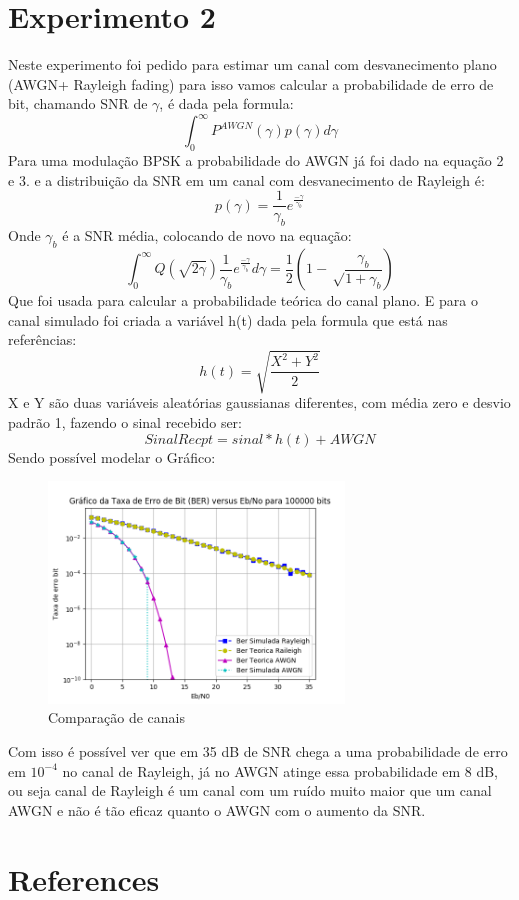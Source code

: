 \documentclass[12pt]{article}
\begin{document}
\section{Experimento 2}
Neste experimento foi pedido para estimar um canal com desvanecimento plano (AWGN+ Rayleigh fading) para isso vamos calcular a probabilidade de erro de bit, chamando SNR de $\gamma$, é dada pela formula:
\begin{equation}
    \int_{0}^{\infty} P^{AWGN}(\gamma )p(\gamma)d\gamma
\end{equation}
Para uma modulação BPSK a probabilidade do AWGN já foi dado na equação 2 e 3. e a distribuição da SNR em um canal com desvanecimento de Rayleigh é:
\begin{equation}
    p(\gamma)= \frac{1}{\gamma_{b}}e^{\frac{-\gamma}{\gamma_{b}}}
\end{equation}
Onde $\gamma _{b}$ é a SNR média, colocando de novo na equação:
\begin{equation}
    \int_{0}^{\infty} Q(\sqrt{2\gamma})\frac{1}{\gamma_{b}}e^{\frac{-\gamma}{\gamma_{b}}}d\gamma = \frac{1}{2}\left(1-\sqrt \frac{\gamma _{b}}{1 +\gamma _{b}}\right)
\end{equation}
Que foi usada para calcular a probabilidade teórica do canal plano. E para o canal simulado foi criada a variável h(t) dada pela formula que está nas referências:
\begin{equation}
    h(t)=\sqrt{\frac{X^{2}+Y^{2}}{2}}
\end{equation}
 X e Y são duas variáveis aleatórias gaussianas diferentes, com média zero e desvio padrão 1, fazendo o sinal recebido ser:
 \begin{equation}
     SinalRecpt=sinal*h(t)+AWGN
 \end{equation}
Sendo possível modelar o Gráfico:
\begin{figure}[h]
    \centering
    \includegraphics[width=0.7\textwidth]{ray.png}
    \caption{Comparação de canais}
    \label{fig:my_label}
\end{figure}
\FloatBarrier
Com isso é possível ver que em 35 dB de SNR chega a uma probabilidade de erro em $10^{-4}$ no canal de Rayleigh, já no AWGN atinge essa probabilidade em 8 dB, ou seja  canal de Rayleigh é um canal com um ruído muito maior que um canal AWGN e não é tão eficaz quanto o AWGN com o aumento da SNR.



\section{References}
\cite{comuni:18}
\cite{Haykin:01}
\cite{proakis:11}



\end{document}
